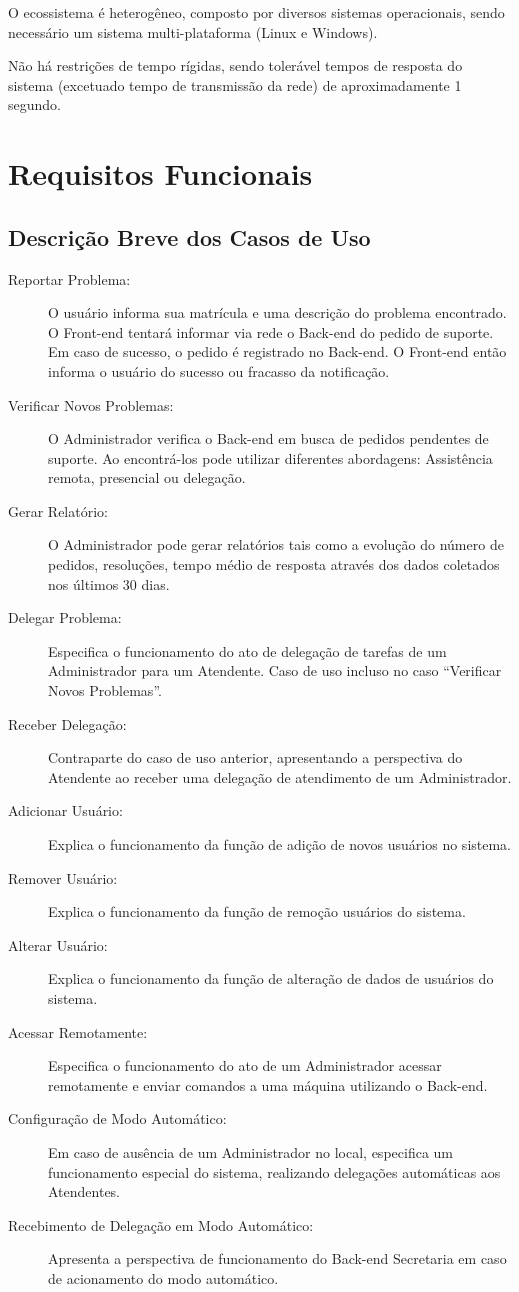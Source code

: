 \documentclass[brazil,times]{abnt}
\begin{document}
O ecossistema é heterogêneo, composto por diversos sistemas operacionais, sendo
necessário um sistema multi-plataforma (Linux e Windows).

Não há restrições de tempo rígidas, sendo tolerável tempos de resposta do
sistema (excetuado tempo de transmissão da rede) de aproximadamente 1 segundo.

\chapter{Requisitos Funcionais}
\section{Descrição Breve dos Casos de Uso}
\begin{description}
  \item[Reportar Problema:] O usuário informa sua matrícula e uma descrição do
  problema encontrado. O Front-end tentará informar via rede o Back-end do
  pedido de suporte. Em caso de sucesso, o pedido é registrado no Back-end. O
  Front-end então informa o usuário do sucesso ou fracasso da notificação.
  \item[Verificar Novos Problemas:] O Administrador verifica o Back-end em
  busca de pedidos pendentes de suporte. Ao encontrá-los pode utilizar
  diferentes abordagens: Assistência remota, presencial ou delegação.
  \item[Gerar Relatório:] O Administrador pode gerar relatórios tais como a
  evolução do número de pedidos, resoluções, tempo médio de resposta através dos
  dados coletados nos últimos 30 dias.
  \item[Delegar Problema:] Especifica o funcionamento do ato de delegação de
  tarefas de um Administrador para um Atendente. Caso de uso incluso no caso
  ``Verificar Novos Problemas''.
  \item[Receber Delegação:] Contraparte do caso de uso anterior, apresentando a
  perspectiva do Atendente ao receber uma delegação de atendimento de um
  Administrador.
  \item[Adicionar Usuário:] Explica o funcionamento da função de adição de novos
  usuários no sistema.
  \item[Remover Usuário:] Explica o funcionamento da função de remoção usuários
  do sistema.
  \item[Alterar Usuário:] Explica o funcionamento da função de alteração de
  dados de usuários do sistema.
  \item[Acessar Remotamente:] Especifica o funcionamento do ato de um
  Administrador acessar remotamente e enviar comandos a uma máquina utilizando o
  Back-end.
  \item[Configuração de Modo Automático:] Em caso de ausência de um
  Administrador no local, especifica um funcionamento especial do sistema, realizando
  delegações automáticas aos Atendentes.
  \item[Recebimento de Delegação em Modo Automático:] Apresenta a perspectiva de
  funcionamento do Back-end Secretaria em caso de acionamento do modo
  automático.
\end{description}
\end{document}
